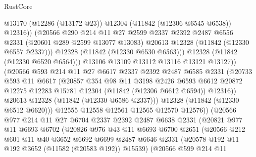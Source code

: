 \begin{lexlean}{RustCore}
\begin{coremodule}
                        @13170
                        (@12286 (@13172 @23))
                        @12304
                        (@11842 (@12306 @6545 @6538))
                        @12316))
                    (@20566
                      @290
                      @214
                      @11
                      @27
                      @2599
                      @2337
                      @2392
                      @2487
                      @6556
                      @2331
                      (@20601 @289 @2599 @13077 @13083)
                      @20613
                      @12328
                      (@11842 (@12330 @6557 @2337)))
                    @12328
                    (@11842 (@12330 @6530 @6563)))
                  @12328
                  (@11842 (@12330 @6520 @6564)))
                @13106
                @13109
                @13112
                @13116
                @13121
                @13127))
            (@20566
              @593
              @214
              @11
              @27
              @6617
              @2337
              @2392
              @2487
              @6585
              @2331
              (@20733
                @593
                @11
                @6617
                (@20857
                  @354
                  @98
                  @11
                  @3198
                  @2426
                  @6593
                  @6612
                  @20872
                  @12275
                  @12283
                  @15781
                  @12304
                  (@11842 (@12306 @6612 @6594))
                  @12316))
              @20613
              @12328
              (@11842 (@12330 @6586 @2337)))
            @12328
            (@11842 (@12330 @6512 @6620)))
          @12555
          @12558
          @12561
          @12565
          @12570
          @12576))
      (@20566
        @977
        @214
        @11
        @27
        @6704
        @2337
        @2392
        @2487
        @6638
        @2331
        (@20821
          @977
          @11
          @6693
          @6702
          (@20826
            @976
            @43
            @11
            @6693
            @6700
            @2651
            (@20566
              @212
              @601
              @11
              @40
              @3652
              @6692
              @6699
              @2487
              @6646
              @2331
              (@20578 @192 @11 @192 @3652 (@11582 (@20583 @192)) @15539)
              (@20566
                @599
                @214
                @11

\end{coremodule}
\end{lexlean}
